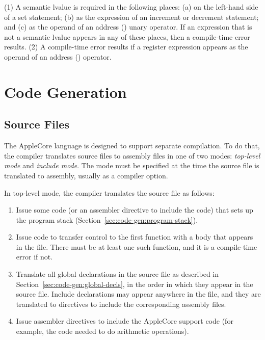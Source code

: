 \documentclass[10pt]{article}
\begin{document}
  (1) A semantic lvalue is
required in the following places: (a) on the left-hand side of a set
statement; (b) as the expression of an increment or decrement
statement; and (c) as the operand of an address () unary
operator.  If an expression that is not a semantic lvalue appears in
any of these places, then a compile-time error results.  (2) A
compile-time error results if a register expression appears as the
operand of an address () operator.


\section{Code Generation}
\label{sec:code-gen}

\subsection{Source Files}
\label{sec:code-gen:source-files}

The AppleCore language is designed to support separate compilation.
To do that, the compiler translates source files to assembly files in
one of two modes: \emph{top-level mode} and \emph{include mode}.  The
mode must be specified at the time the source file is translated to
assembly, usually as a compiler option.

  In top-level mode, the compiler translates
the source file as follows:
%
\begin{enumerate}
%
\item Issue some code (or an assembler directive to include the code)
  that sets up the program stack
  (Section~\ref{sec:code-gen:program-stack}).
%
\item Issue code to transfer control to the first function with a body
  that appears in the file.  There must be at least one such function,
  and it is a compile-time error if not.
%
\item Translate all global declarations in the source file as
  described in Section~\ref{sec:code-gen:global-decls}, in the
  order in which they appear in the source file.  Include declarations
  may appear anywhere in the file, and they are translated to
  directives to include the corresponding assembly files.
%
\item Issue assembler directives to include the AppleCore support code
  (for example, the code needed to do arithmetic operations).
%
\end{enumerate}
%
\end{document}
